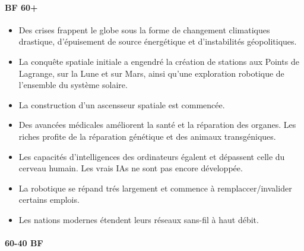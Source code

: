 \documentclass[a4paper,9pt]{article}
\begin{document}
\begin{multicols}{3}

\footnotesize

\paragraph{BF 60+} 

\begin{itemize}

   \item Des crises frappent le globe sous la forme de changement climatiques
      drastique, d'épuisement de source énergétique et d'instabilités
      géopolitiques. 
   \item La conquête spatiale initiale a engendré la création de stations aux
      Points de Lagrange, sur la Lune et sur Mars, ainsi qu'une exploration
      robotique de l'ensemble du système solaire. 
   \item La construction d'un ascensseur spatiale est commencée. 
   \item Des avancées médicales améliorent la santé et la réparation des
      organes. Les riches profite de la réparation génétique et des animaux
      transgéniques. 
   \item Les capacités d'intelligences des ordinateurs égalent et dépassent
      celle du cerveau humain. Les vrais IAs ne sont pas encore développée. 
   \item La robotique se répand trés largement et commence à
      remplaccer/invalider certains emplois. 
   \item Les nations modernes étendent leurs réseaux sans-fil à haut débit.
\end{itemize} 

\paragraph{60-40 BF} 


\end{multicols}
\end{document}
